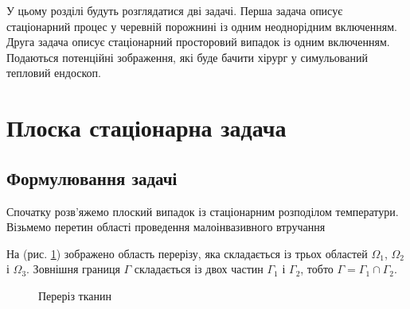 У цьому розділі будуть розглядатися дві задачі. Перша задача описує стаціонарний процес у черевній порожнині із одним 
неоднорідним включенням. Друга задача описує стаціонарний просторовий випадок із одним включенням. Подаються потенційні 
зображення, які буде бачити хірург у симульований тепловий ендоскоп.

\section{Плоска стаціонарна задача}

\subsection{Формулювання задачі}

Спочатку розв'яжемо плоский випадок із стаціонарним розподілом температури.
Візьмемо перетин області проведення малоінвазивного втручання

На (рис. \ref{fig:thermo_2d_domain}) зображено область перерізу, яка складається із трьох областей $\Omega_1$, 
$\Omega_2$ і $\Omega_3$. Зовнішня границя $\Gamma$ складається із двох частин $\Gamma_1$ і $\Gamma_2$, тобто 
$\Gamma=\Gamma_1\cap\Gamma_2$. 

\begin{figure}[ht!]
    \centering
    
    \caption{Переріз тканин}
    \label{fig:thermo_2d_domain}
\end{figure}

